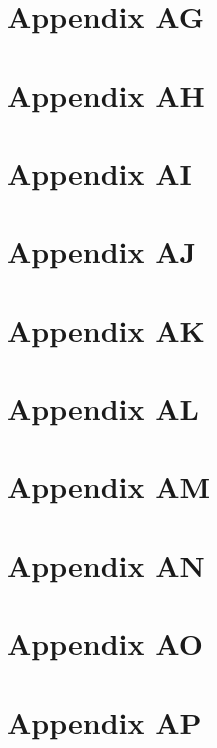 \chapter{Appendix AG}

\chapter{Appendix AH}

\chapter{Appendix AI}

\chapter{Appendix AJ}

\chapter{Appendix AK}

\chapter{Appendix AL}

\chapter{Appendix AM}

\chapter{Appendix AN}

\chapter{Appendix AO}

\chapter{Appendix AP}

